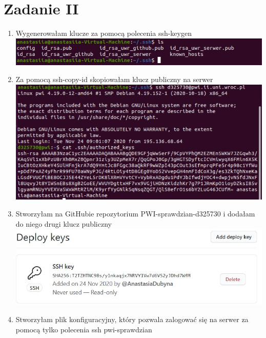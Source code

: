 \documentclass[12pt]{article}
\begin{document}
\section*{Zadanie II}
\begin{enumerate}
    \item Wygenerowałam klucze za pomocą polecenia ssh-keygen\\
    
    \includegraphics[scale = 0.9]{1.jpg}
    \item Za pomocą ssh-copy-id skopiowałam klucz publiczny na serwer \\
    
    \includegraphics[scale = 0.9]{2.jpg}
    \item Stworzyłam na GitHubie repozytorium PWI-sprawdzian-d325730 i dodałam do niego drugi klucz publiczny \\
    
    \includegraphics[scale = 0.9]{3.jpg}
    \newpage
    \item Stworzyłam plik konfiguracyjny, który pozwala zalogować się na serwer za pomocą tylko polecenia ssh pwi-sprawdzian\\
    

\end{enumerate}
\end{document}
